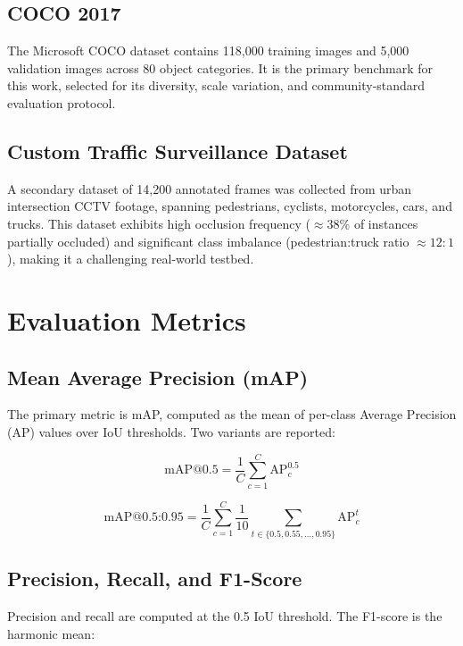 \documentclass[12pt, a4paper]{report}
\begin{document}
\subsection{COCO 2017}
The Microsoft COCO dataset \cite{lin2014coco} contains 118,000 training images 
and 5,000 validation images across 80 object categories. It is the primary 
benchmark for this work, selected for its diversity, scale variation, and 
community-standard evaluation protocol.

\subsection{Custom Traffic Surveillance Dataset}
A secondary dataset of 14,200 annotated frames was collected from urban 
intersection CCTV footage, spanning pedestrians, cyclists, motorcycles, 
cars, and trucks. This dataset exhibits high occlusion frequency 
($\approx 38\%$ of instances partially occluded) and significant class 
imbalance (pedestrian:truck ratio $\approx 12:1$), making it a challenging 
real-world testbed.

\section{Evaluation Metrics}

\subsection{Mean Average Precision (mAP)}
The primary metric is mAP, computed as the mean of per-class Average Precision 
(AP) values over IoU thresholds. Two variants are reported:

\begin{equation}
  \text{mAP@0.5} = \frac{1}{C} \sum_{c=1}^{C} \text{AP}_c^{0.5}
  \label{eq:map50}
\end{equation}

\begin{equation}
  \text{mAP@0.5:0.95} = \frac{1}{C} \sum_{c=1}^{C} \frac{1}{10} 
  \sum_{t \in \{0.5, 0.55, \ldots, 0.95\}} \text{AP}_c^{t}
  \label{eq:map5095}
\end{equation}

\subsection{Precision, Recall, and F1-Score}
Precision and recall are computed at the 0.5 IoU threshold. The F1-score 
is the harmonic mean:
\end{document}
